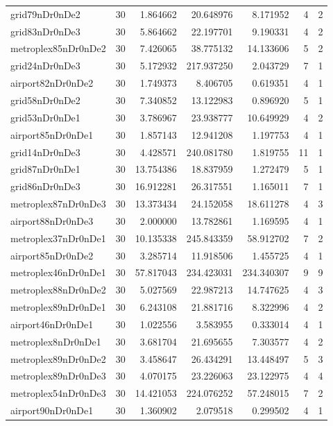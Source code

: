 \begin{longtable}{|l|r|r|r|r|r|r|}
grid79nDr0nDe2 & 30 & 1.864662 & 20.648976 & 8.171952 & 4 & 2 \\
grid83nDr0nDe3 & 30 & 5.864662 & 22.197701 & 9.190331 & 4 & 2 \\
metroplex85nDr0nDe2 & 30 & 7.426065 & 38.775132 & 14.133606 & 5 & 2 \\
grid24nDr0nDe3 & 30 & 5.172932 & 217.937250 & 2.043729 & 7 & 1 \\
airport82nDr0nDe2 & 30 & 1.749373 & 8.406705 & 0.619351 & 4 & 1 \\
grid58nDr0nDe2 & 30 & 7.340852 & 13.122983 & 0.896920 & 5 & 1 \\
grid53nDr0nDe1 & 30 & 3.786967 & 23.938777 & 10.649929 & 4 & 2 \\
airport85nDr0nDe1 & 30 & 1.857143 & 12.941208 & 1.197753 & 4 & 1 \\
grid14nDr0nDe3 & 30 & 4.428571 & 240.081780 & 1.819755 & 11 & 1 \\
grid87nDr0nDe1 & 30 & 13.754386 & 18.837959 & 1.272479 & 5 & 1 \\
grid86nDr0nDe3 & 30 & 16.912281 & 26.317551 & 1.165011 & 7 & 1 \\
metroplex87nDr0nDe3 & 30 & 13.373434 & 24.152058 & 18.611278 & 4 & 3 \\
airport88nDr0nDe3 & 30 & 2.000000 & 13.782861 & 1.169595 & 4 & 1 \\
metroplex37nDr0nDe1 & 30 & 10.135338 & 245.843359 & 58.912702 & 7 & 2 \\
airport85nDr0nDe2 & 30 & 3.285714 & 11.918506 & 1.455725 & 4 & 1 \\
metroplex46nDr0nDe1 & 30 & 57.817043 & 234.423031 & 234.340307 & 9 & 9 \\
metroplex88nDr0nDe2 & 30 & 5.027569 & 22.987213 & 14.747625 & 4 & 3 \\
metroplex89nDr0nDe1 & 30 & 6.243108 & 21.881716 & 8.322996 & 4 & 2 \\
airport46nDr0nDe1 & 30 & 1.022556 & 3.583955 & 0.333014 & 4 & 1 \\
metroplex8nDr0nDe1 & 30 & 3.681704 & 21.695655 & 7.303577 & 4 & 2 \\
metroplex89nDr0nDe2 & 30 & 3.458647 & 26.434291 & 13.448497 & 5 & 3 \\
metroplex89nDr0nDe3 & 30 & 4.070175 & 23.226063 & 23.122975 & 4 & 4 \\
metroplex54nDr0nDe3 & 30 & 14.421053 & 224.076252 & 57.248015 & 7 & 2 \\
airport90nDr0nDe1 & 30 & 1.360902 & 2.079518 & 0.299502 & 4 & 1 \\

\end{longtable}
